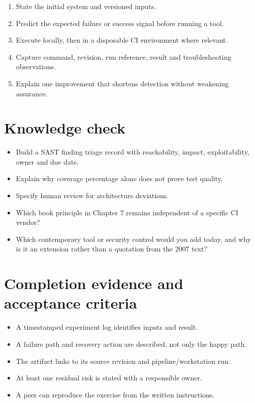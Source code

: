 \documentclass[11pt,letterpaper]{article}
\begin{document}
\begin{enumerate}
\item State the initial system and versioned inputs.
\item Predict the expected failure or success signal before running a tool.
\item Execute locally, then in a disposable CI environment where relevant.
\item Capture command, revision, run reference, result and troubleshooting observations.
\item Explain one improvement that shortens detection without weakening assurance.
\end{enumerate}
\section{Knowledge check}
\begin{itemize}
\item Build a SAST finding triage record with reachability, impact, exploitability, owner and due date.
\item Explain why coverage percentage alone does not prove test quality.
\item Specify human review for architecture deviations.
\item Which book principle in Chapter 7 remains independent of a specific CI vendor?
\item Which contemporary tool or security control would you add today, and why is it an extension rather than a quotation from the 2007 text?
\end{itemize}
\section{Completion evidence and acceptance criteria}
\begin{itemize}
\item A timestamped experiment log identifies inputs and result.
\item A failure path and recovery action are described, not only the happy path.
\item The artifact links to its source revision and pipeline/workstation run.
\item At least one residual risk is stated with a responsible owner.
\item A peer can reproduce the exercise from the written instructions.
\end{itemize}
\end{document}
